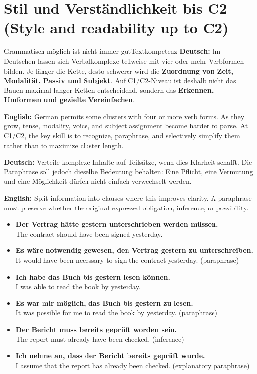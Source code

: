 \documentclass[a4paper,11pt]{article}
\newcommand{\GermanText}[1]{\textbf{Deutsch: }#1\par}
\newcommand{\EnglishText}[1]{{\small\color{SoftGray}\textbf{English: }#1\par}}
\newcommand{\ExampleItem}[2]{\item \textbf{#1}\\{\small\color{SoftGray}#2}}
\newcommand{\DEEN}[2]{\GermanText{#1}\EnglishText{#2}}
\newcommand{\Pair}[2]{\ExampleItem{#1}{#2}}
\begin{document}
\section{Stil und Verständlichkeit bis C2 \textnormal{(Style and readability up to C2)}}
\begin{grammarentry}{Grammatisch möglich ist nicht immer gut}{Textkompetenz}
\DEEN{Im Deutschen lassen sich Verbalkomplexe teilweise mit vier oder mehr Verbformen bilden. Je länger die Kette, desto schwerer wird die \textbf{Zuordnung von Zeit, Modalität, Passiv und Subjekt}. Auf C1/C2-Niveau ist deshalb nicht das Bauen maximal langer Ketten entscheidend, sondern das \textbf{Erkennen, Umformen und gezielte Vereinfachen}.}{German permits some clusters with four or more verb forms. As they grow, tense, modality, voice, and subject assignment become harder to parse. At C1/C2, the key skill is to recognize, paraphrase, and selectively simplify them rather than to maximize cluster length.}
\DEEN{Verteile komplexe Inhalte auf Teilsätze, wenn dies Klarheit schafft. Die Paraphrase soll jedoch dieselbe Bedeutung behalten: Eine Pflicht, eine Vermutung und eine Möglichkeit dürfen nicht einfach verwechselt werden.}{Split information into clauses where this improves clarity. A paraphrase must preserve whether the original expressed obligation, inference, or possibility.}
\end{grammarentry}
\begin{exbox}\begin{itemize}
\Pair{Der Vertrag hätte gestern unterschrieben werden müssen.}{The contract should have been signed yesterday.}
\Pair{Es wäre notwendig gewesen, den Vertrag gestern zu unterschreiben.}{It would have been necessary to sign the contract yesterday. (paraphrase)}
\Pair{Ich habe das Buch bis gestern lesen können.}{I was able to read the book by yesterday.}
\Pair{Es war mir möglich, das Buch bis gestern zu lesen.}{It was possible for me to read the book by yesterday. (paraphrase)}
\Pair{Der Bericht muss bereits geprüft worden sein.}{The report must already have been checked. (inference)}
\Pair{Ich nehme an, dass der Bericht bereits geprüft wurde.}{I assume that the report has already been checked. (explanatory paraphrase)}
\end{itemize}\end{exbox}
\end{document}
